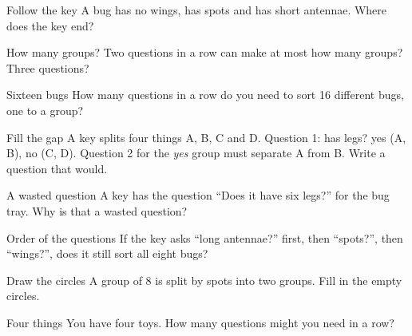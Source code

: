 \clearpage

\begin{puzzle}{Follow the key}
A bug has no wings, has spots and has short antennae. Where does the key end? \wline[1.6cm]
\end{puzzle}

\begin{puzzle}{How many groups?}
Two questions in a row can make at most how many groups? \wline[1.6cm]\\
Three questions? \wline[1.6cm]
\end{puzzle}

\begin{puzzle}{Sixteen bugs}
How many questions in a row do you need to sort 16 different bugs, one to a group? \wline[1.6cm]
\end{puzzle}

\begin{puzzle}{Fill the gap}
A key splits four things A, B, C and D. Question 1: has legs? yes (A, B), no (C, D). Question 2 for the \emph{yes} group must separate A from B. Write a question that would. \wline[6cm]
\end{puzzle}

\begin{puzzle}{A wasted question}
A key has the question ``Does it have six legs?'' for the bug tray. Why is that a wasted question? \wline[6cm]
\end{puzzle}

\clearpage

\begin{puzzle}{Order of the questions}
If the key asks ``long antennae?'' first, then ``spots?'', then ``wings?'', does it still sort all eight bugs? \wline[2cm]
\end{puzzle}

\begin{puzzle}{Draw the circles}
A group of 8 is split by spots into two groups. Fill in the empty circles.
\begin{center}
\end{center}
\end{puzzle}

\begin{puzzle}{Four things}
You have four toys. How many questions might you need in a row? \wline[1.6cm]
\end{puzzle}

